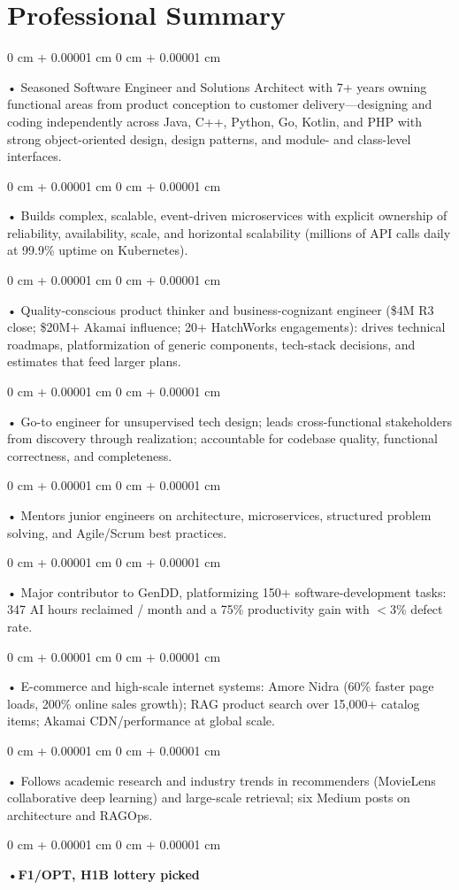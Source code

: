 \documentclass[10pt, letterpaper]{article}
\newenvironment{onecolentry}{
    \begin{adjustwidth}{
        0 cm + 0.00001 cm
    }{
        0 cm + 0.00001 cm
    }
}{
    \end{adjustwidth}
} %
\begin{document}
    \section{Professional Summary}
        \vspace{2 pt }
        \begin{onecolentry}
            • Seasoned Software Engineer and Solutions Architect with 7+ years owning functional areas from product conception to customer delivery---designing and coding independently across Java, C++, Python, Go, Kotlin, and PHP with strong object-oriented design, design patterns, and module- and class-level interfaces.
        \end{onecolentry}
        \begin{onecolentry}
            • Builds complex, scalable, event-driven microservices with explicit ownership of reliability, availability, scale, and horizontal scalability (millions of API calls daily at 99.9\% uptime on Kubernetes).
        \end{onecolentry}
        \begin{onecolentry}
            • Quality-conscious product thinker and business-cognizant engineer (\$4M R3 close; \$20M+ Akamai influence; 20+ HatchWorks engagements): drives technical roadmaps, platformization of generic components, tech-stack decisions, and estimates that feed larger plans.
        \end{onecolentry}
        \begin{onecolentry}
            • Go-to engineer for unsupervised tech design; leads cross-functional stakeholders from discovery through realization; accountable for codebase quality, functional correctness, and completeness.
        \end{onecolentry}
        \begin{onecolentry}
            • Mentors junior engineers on architecture, microservices, structured problem solving, and Agile/Scrum best practices.
        \end{onecolentry}
        \begin{onecolentry}
            • Major contributor to GenDD, platformizing 150+ software-development tasks: 347 AI hours reclaimed / month and a 75\% productivity gain with $<$3\% defect rate.
        \end{onecolentry}
        \begin{onecolentry}
            • E-commerce and high-scale internet systems: Amore Nidra (60\% faster page loads, 200\% online sales growth); RAG product search over 15,000+ catalog items; Akamai CDN/performance at global scale.
        \end{onecolentry}
        \begin{onecolentry}
            • Follows academic research and industry trends in recommenders (MovieLens collaborative deep learning) and large-scale retrieval; six Medium posts on architecture and RAGOps.
        \end{onecolentry}
        \begin{onecolentry}
                \textbf{•F1/OPT, H1B lottery picked}
        \end{onecolentry}
\end{document}
